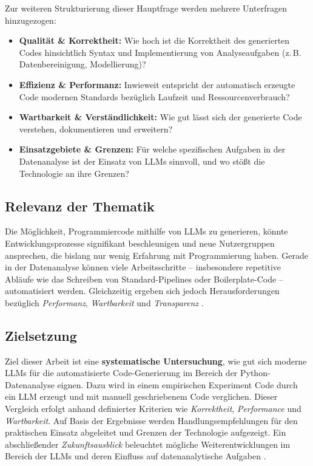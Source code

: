 \documentclass[11pt,a4paper]{article}
\begin{document}
Zur weiteren Strukturierung dieser Hauptfrage werden mehrere Unterfragen hinzugezogen:
\begin{itemize}
    \item \textbf{Qualität \& Korrektheit:} Wie hoch ist die Korrektheit des generierten Codes hinsichtlich Syntax und Implementierung von Analyseaufgaben (z.\,B. Datenbereinigung, Modellierung)?
    \item \textbf{Effizienz \& Performanz:} Inwieweit entspricht der automatisch erzeugte Code modernen Standards bezüglich Laufzeit und Ressourcenverbrauch?
    \item \textbf{Wartbarkeit \& Verständlichkeit:} Wie gut lässt sich der generierte Code verstehen, dokumentieren und erweitern?
    \item \textbf{Einsatzgebiete \& Grenzen:} Für welche spezifischen Aufgaben in der Datenanalyse ist der Einsatz von LLMs sinnvoll, und wo stößt die Technologie an ihre Grenzen?
\end{itemize}

\subsection{Relevanz der Thematik}
Die Möglichkeit, Programmiercode mithilfe von LLMs zu generieren, könnte Entwicklungsprozesse signifikant beschleunigen und neue Nutzergruppen ansprechen, die bislang nur wenig Erfahrung mit Programmierung haben. Gerade in der Datenanalyse können viele Arbeitsschritte -- insbesondere repetitive Abläufe wie das Schreiben von Standard-Pipelines oder Boilerplate-Code -- automatisiert werden. Gleichzeitig ergeben sich jedoch Herausforderungen bezüglich \emph{Performanz}, \emph{Wartbarkeit} und \emph{Transparenz} \cite{web:2}.

\subsection{Zielsetzung}
Ziel dieser Arbeit ist eine \textbf{systematische Untersuchung}, wie gut sich moderne LLMs für die automatisierte Code-Generierung im Bereich der Python-Datenanalyse eignen. Dazu wird in einem empirischen Experiment Code durch ein LLM erzeugt und mit manuell geschriebenem Code verglichen. Dieser Vergleich erfolgt anhand definierter Kriterien wie \emph{Korrektheit}, \emph{Performance} und \emph{Wartbarkeit}. Auf Basis der Ergebnisse werden Handlungsempfehlungen für den praktischen Einsatz abgeleitet und Grenzen der Technologie aufgezeigt. Ein abschließender \emph{Zukunftsausblick} beleuchtet mögliche Weiterentwicklungen im Bereich der LLMs und deren Einfluss auf datenanalytische Aufgaben \cite{web:3,web:4}.
\end{document}
